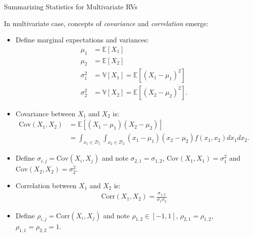 \documentclass[9pt]{beamer}
\begin{document}
%
\begin{frame}{Summarizing Statistics for Multivariate RVs}

In multivariate case, concepts of {\em covariance} and {\em correlation} emerge:
\begin{itemize}
\setlength{\itemsep}{5pt}
\item Define marginal expectations and variances:
\begin{align*}
\mu_{1}&=\mathbb{E}[X_1]\\
\mu_{2}&=\mathbb{E}[X_2]\\
\sigma_1^2&=\mathbb{V}[X_1]=\mathbb{E}[(X_1-\mu_1)^2]\\
\sigma_2^2&=\mathbb{V}[X_2]=\mathbb{E}[(X_2-\mu_2)^2].
\end{align*}
\item Covariance between $X_1$ and $X_2$ is:
 \begin{align*}
\textrm{Cov}(X_1,X_2)&=\mathbb{E}[(X_1-\mu_1)(X_2-\mu_2)]\\
&=\int_{x_1\in \mathcal{D}_1}\int_{x_2\in\mathcal{D}_2}(x_1-\mu_1)(x_2-\mu_2)f(x_1,x_2)dx_1dx_2.
\end{align*}
\item Define $\sigma_{i,j}=\textrm{Cov}(X_i,X_j)$ and note $\sigma_{2,1}=\sigma_{1,2}$, $\textrm{Cov}(X_1,X_1)=\sigma_1^2$ and $\textrm{Cov}(X_2,X_2)=\sigma_2^2$. 
\item Correlation between $X_1$ and $X_2$ is:
 \begin{align*}
\textrm{Corr}(X_1,X_2)=\frac{\sigma_{1,2}}{\sigma_1\sigma_2}
\end{align*}
\item  Define $\rho_{i,j}=\textrm{Corr}(X_i,X_j)$ and note $\rho_{1,2}\in [-1,1]$, $\rho_{2,1}=\rho_{1,2}$, $\rho_{1,1}=\rho_{2,2}=1$. 
\end{itemize}

\end{frame}
\end{document}
